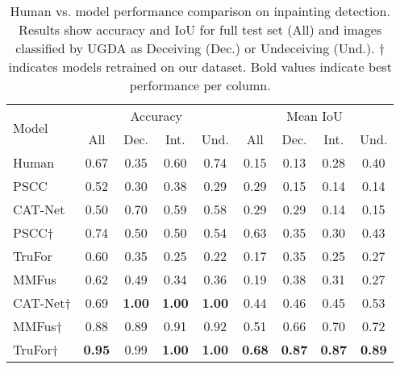 \begin{table}[!htb]
\centering
\setlength{\tabcolsep}{0.9mm}
\begin{tabular}{lcccccccc}
\hline
\multirow{2}{*}{Model} & \multicolumn{4}{c}{Accuracy} & \multicolumn{4}{c}{Mean IoU} \\
& All & Dec. & Int. & Und. & All & Dec. & Int. & Und. \\
\hline
Human & 0.67 & 0.35 & 0.60 & 0.74 & 0.15 & 0.13 & 0.28 & 0.40 \\
PSCC & 0.52 & 0.30 & 0.38 & 0.29 & 0.29 & 0.15 & 0.14 & 0.14 \\
CAT-Net & 0.50 & 0.70 & 0.59 & 0.58 & 0.29 & 0.29 & 0.14 & 0.15 \\
PSCC† & 0.74 & 0.50& 0.50 & 0.54 & 0.63 & 0.35 & 0.30 & 0.43 \\
TruFor & 0.60 & 0.35 & 0.25 & 0.22 & 0.17 & 0.35 & 0.25 & 0.27 \\
MMFus & 0.62 & 0.49 & 0.34 & 0.36 & 0.19 & 0.38 & 0.31 & 0.27 \\
CAT-Net† & 0.69 & \textbf{1.00} & \textbf{1.00} & \textbf{1.00} & 0.44 & 0.46 & 0.45 & 0.53 \\
MMFus† & 0.88 & 0.89 & 0.91 & 0.92 & 0.51 & 0.66 & 0.70 & 0.72 \\
TruFor† & \textbf{0.95} & 0.99 & \textbf{1.00} & \textbf{1.00} & \textbf{0.68} & \textbf{0.87} & \textbf{0.87 }& \textbf{0.89} \\
\hline
\end{tabular}
\caption{Human vs. model performance comparison on inpainting detection. Results show accuracy and IoU for full test set (All) and images classified by UGDA as Deceiving (Dec.) or Undeceiving (Und.). † indicates models retrained on our dataset. Bold values indicate best performance per column.}
\label{tab:human_comparison}
\end{table}

